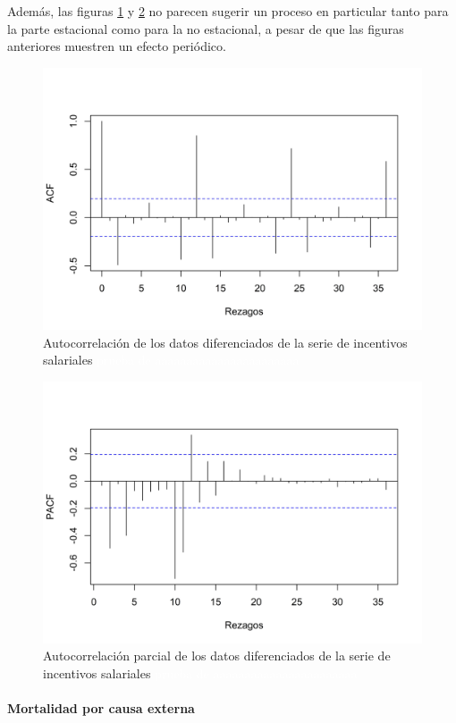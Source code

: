 \documentclass[
]{article}
\begin{document}
Además, las figuras \ref{fig:incentivos_acf} y \ref{fig:incentivos_pacf}
no parecen sugerir un proceso en particular tanto para la parte
estacional como para la no estacional, a pesar de que las figuras
anteriores muestren un efecto periódico.

\begin{figure}[H]
\includegraphics[width=0.8\linewidth,height=0.8\textheight]{Tesis_files/figure-latex/incentivos_acf-1} \caption{Autocorrelación de los datos diferenciados de la serie de incentivos salariales \textcolor{white}{prueba de aaaaaaaaaaaaaaaaaaaaaaa}}\label{fig:incentivos_acf}
\end{figure}
\begin{figure}[H]
\includegraphics[width=0.8\linewidth,height=0.8\textheight]{Tesis_files/figure-latex/incentivos_pacf-1} \caption{Autocorrelación parcial de los datos diferenciados de la serie de incentivos salariales \textcolor{white}{prueba de aaaaaaaaaaaaaaaaaaaaaaa}}\label{fig:incentivos_pacf}
\end{figure}

\paragraph{Mortalidad por causa externa}
\end{document}
